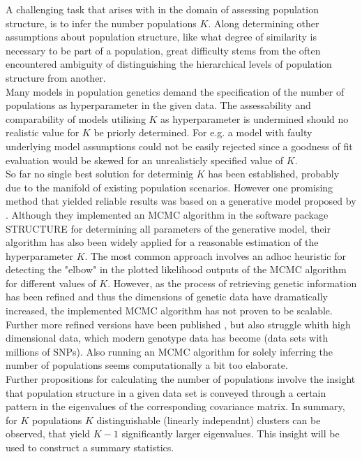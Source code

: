 \documentclass[a4paper, 11pt]{article}
\begin{document}
A challenging task that arises with in the domain of assessing population structure, is to infer the number populations $K$. Along determining other assumptions about population structure, like what degree of similarity is necessary to be part of a population, great difficulty stems from the often encountered ambiguity of distinguishing the hierarchical levels of population structure from another.\\ Many models in population genetics demand the specification of the number of populations as hyperparameter in the given data. The assessability and comparability of models utilising $K$ as hyperparameter is undermined should no realistic value for $K$ be priorly determined. For e.g. a model with faulty underlying model assumptions could not be easily rejected since a goodness of fit evaluation would be skewed for an unrealisticly specified value of $K$.\\
So far no single best solution for determinig $K$ has been established, probably due to the manifold of existing population scenarios. However one promising method that yielded reliable results was based on a generative model proposed by \cite{pritchard2000inference, falush2003inference}. Although they implemented an MCMC algorithm in the software package STRUCTURE for determining all parameters of the generative model, their algorithm has also been widely applied for a reasonable estimation of the hyperparameter $K$. The most common approach involves an adhoc heuristic for detecting the "elbow" in the plotted  likelihood outputs of the MCMC algorithm for different values of $K$. However, as the process of retrieving genetic information has been refined and thus the dimensions of genetic data have dramatically increased, the implemented MCMC algorithm has not proven to be scalable. Further more refined versions have been published \parencite{patterson2006population}, but also struggle whith high dimensional data, which modern genotype data has become (data sets with millions of SNPs). Also running an MCMC algorithm for solely inferring the number of populations seems computationally a bit too elaborate.\\
Further propositions for calculating the number of populations involve the insight that population structure in a given data set is conveyed through a certain pattern in the eigenvalues of the corresponding covariance matrix. In summary, for $K$ populations $K$ distinguishable (linearly independnt) clusters can be observed, that yield $K-1$ significantly larger eigenvalues. This insight will be used to construct a summary statistics.\\
\end{document}
